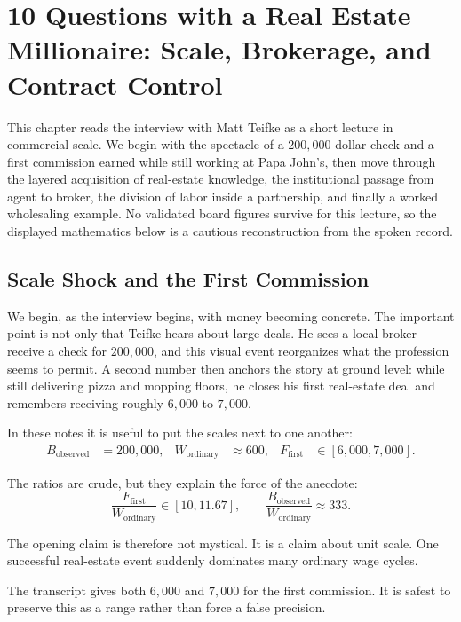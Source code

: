 \chapter{10 Questions with a Real Estate Millionaire: Scale, Brokerage, and Contract Control}

This chapter reads the interview with Matt Teifke as a short lecture in commercial scale. We begin with the spectacle of a \(200{,}000\) dollar check and a first commission earned while still working at Papa John's, then move through the layered acquisition of real-estate knowledge, the institutional passage from agent to broker, the division of labor inside a partnership, and finally a worked wholesaling example. No validated board figures survive for this lecture, so the displayed mathematics below is a cautious reconstruction from the spoken record.

\section{Scale Shock and the First Commission}

We begin, as the interview begins, with money becoming concrete. The important point is not only that Teifke hears about large deals. He sees a local broker receive a check for \(200{,}000\), and this visual event reorganizes what the profession seems to permit. A second number then anchors the story at ground level: while still delivering pizza and mopping floors, he closes his first real-estate deal and remembers receiving roughly \(6{,}000\) to \(7{,}000\).

In these notes it is useful to put the scales next to one another:
\begin{align}
B_{\mathrm{observed}} &= 200{,}000, &
W_{\mathrm{ordinary}} &\approx 600, &
F_{\mathrm{first}} &\in [6{,}000,7{,}000].
\end{align}

The ratios are crude, but they explain the force of the anecdote:
\begin{equation}
\frac{F_{\mathrm{first}}}{W_{\mathrm{ordinary}}} \in [10,11.67],
\qquad
\frac{B_{\mathrm{observed}}}{W_{\mathrm{ordinary}}} \approx 333.
\end{equation}

The opening claim is therefore not mystical. It is a claim about unit scale. One successful real-estate event suddenly dominates many ordinary wage cycles.

\begin{remark}
The transcript gives both \(6{,}000\) and \(7{,}000\) for the first commission. It is safest to preserve this as a range rather than force a false precision.
\end{remark}

